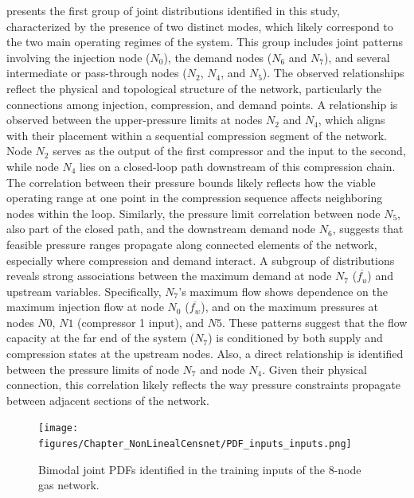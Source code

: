  presents the first group of joint distributions identified in this study, characterized by the presence of two distinct modes, which likely correspond to the two main operating regimes of the system. This group includes joint patterns involving the injection node ($N_0$), the demand nodes ($N_6$ and $N_7$), and several intermediate or pass-through nodes ($N_2$, $N_4$, and $N_5$). The observed relationships reflect the physical and topological structure of the network, particularly the connections among injection, compression, and demand points. A relationship is observed between the upper-pressure limits at nodes \( N_2 \) and \( N_4 \), which aligns with their placement within a sequential compression segment of the network. Node \( N_2 \) serves as the output of the first compressor and the input to the second, while node \( N_4 \) lies on a closed-loop path downstream of this compression chain. The correlation between their pressure bounds likely reflects how the viable operating range at one point in the compression sequence affects neighboring nodes within the loop. Similarly, the pressure limit correlation between node \( N_5 \), also part of the closed path, and the downstream demand node \( N_6 \), suggests that feasible pressure ranges propagate along connected elements of the network, especially where compression and demand interact. A subgroup of distributions reveals strong associations between the maximum demand at node $N_7$ ($\overline{f_u}$) and upstream variables. Specifically, $N_7$'s maximum flow shows dependence on the maximum injection flow at node $N_0$ ($\overline{f_w}$), and on the maximum pressures at nodes $N0$, $N1$ (compressor 1 input), and $N5$. These patterns suggest that the flow capacity at the far end of the system ($N_7$) is conditioned by both supply and compression states at the upstream nodes. Also, a direct relationship is identified between the pressure limits of node $N_7$ and node $N_4$. Given their physical connection, this correlation likely reflects the way pressure constraints propagate between adjacent sections of the network.

\begin{figure}[h]
    \begin{center}
        \texttt{[image: figures/Chapter\_NonLinealCensnet/PDF\_inputs\_inputs.png]}
    \end{center}
    \caption{Bimodal joint PDFs identified in the training inputs of the 8-node gas network. }\label{fig:joint_distributions_input_input}
\end{figure}

